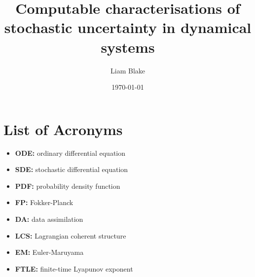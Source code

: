\documentclass[12pt, a4paper, twoside]{book}
\title{Computable characterisations of stochastic uncertainty in dynamical systems}
\author{Liam Blake}
\date{\today}
\begin{document}
\frontmatter

\maketitle

\listoftodos

\tableofcontents
\listoffigures

\chapter{List of Acronyms}
\newcommand{\acr}[2]{\item[] \textbf{#1:} #2}
\begin{itemize}
	\acr{ODE}{ordinary differential equation}
	\acr{SDE}{stochastic differential equation}
	\acr{PDF}{probability density function}
	\acr{FP}{Fokker-Planck}
	\acr{DA}{data assimilation}
	\acr{LCS}{Lagrangian coherent structure}
	\acr{EM}{Euler-Maruyama}
	\acr{FTLE}{finite-time Lyapunov exponent}
\end{itemize}




% 


\mainmatter









\appendix

% 
% 
% 


\backmatter



\end{document}
